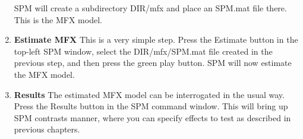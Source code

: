 \begin{enumerate}
    SPM will create a subdirectory DIR/mfx and place an SPM.mat file there. This is the MFX model.
    
\item \textbf{Estimate MFX}
This is a very simple step. Press the Estimate button in the top-left SPM window, select the DIR/mfx/SPM.mat file created in the previous step, and then press the green play button. SPM will now estimate the MFX model.
\item \textbf{Results} 
The estimated MFX model can be interrogated in the usual way. Press the Results button in the SPM command window. This will bring up SPM contrasts manner, where you can specify effects to test as described in previous chapters.

\end{enumerate}

